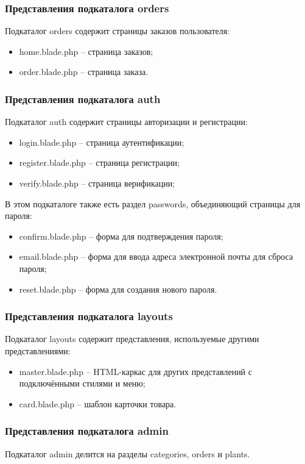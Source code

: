 \subsubsection{Представления подкаталога orders}
Подкаталог orders содержит страницы заказов пользователя:
\begin{itemize}
	\item home.blade.php – страница заказов;
	\item order.blade.php – страница заказа.
\end{itemize}

\subsubsection{Представления подкаталога auth}
Подкаталог auth содержит страницы авторизации и регистрации:
\begin{itemize}
	\item login.blade.php – страница аутентификации;
	\item register.blade.php – страница регистрации;
	\item verify.blade.php – страница верификации;
\end{itemize}

В этом подкаталоге также есть раздел passwords, объединяющий страницы для пароля:
\begin{itemize}
	\item confirm.blade.php – форма для подтверждения пароля;
	\item email.blade.php – форма для ввода адреса электронной почты для сброса пароля;
	\item reset.blade.php – форма для создания нового пароля.
\end{itemize}

\subsubsection{Представления подкаталога layouts}
Подкаталог layouts содержит представления, используемые другими представлениями:
\begin{itemize}
	\item master.blade.php – HTML-каркас для других представлений с подключёнными стилями и меню;
	\item card.blade.php – шаблон карточки товара.
\end{itemize}

\subsubsection{Представления подкаталога admin}
Подкаталог admin делится на разделы categories, orders и plants. 

